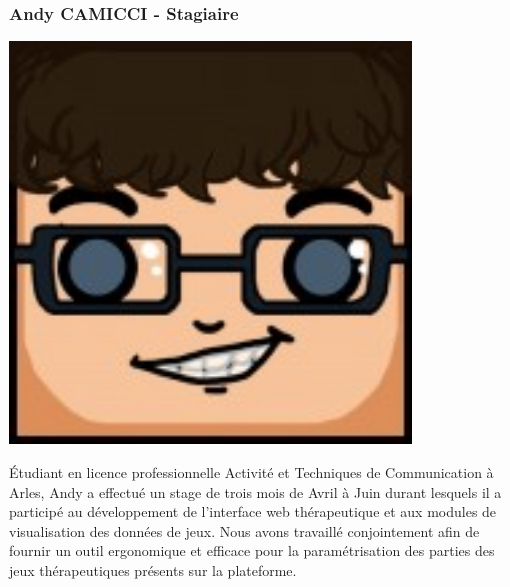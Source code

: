 		\subsubsection*{Andy CAMICCI - Stagiaire}
\begin{minipage}[t!]{0.2\linewidth}
\centering
\includegraphics[width=0.8\textwidth]{images/tetocarre/andy}
\end{minipage}
\begin{minipage}[t!]{0.79\linewidth}
Étudiant en licence professionnelle Activité et Techniques de Communication à Arles, Andy a effectué un stage de trois mois de Avril à Juin durant lesquels il a participé au développement de l'interface web thérapeutique et aux modules de visualisation des données de jeux. Nous avons travaillé conjointement afin de fournir un outil ergonomique et efficace pour la paramétrisation des parties des jeux thérapeutiques présents sur la plateforme.
\end{minipage}
		
